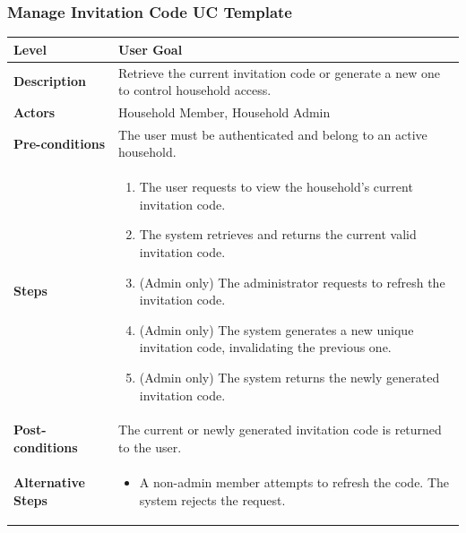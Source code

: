 \subsubsection{Manage Invitation Code UC Template}
\begin{longtable}{|p{3.5cm}|p{10.3cm}|}
\hline
\rowcolor{UCRow} \textbf{Level} & User Goal \\ \hline
\textbf{Description} & Retrieve the current invitation code or generate a new one to control household access. \\ \hline
\rowcolor{UCRow} \textbf{Actors} & Household Member, Household Admin \\ \hline
\textbf{Pre-conditions} & The user must be authenticated and belong to an active household. \\ \hline
\rowcolor{UCRow} \textbf{Steps} &
\begin{enumerate}[nosep, leftmargin=*]
    \item The user requests to view the household's current invitation code.
    \item The system retrieves and returns the current valid invitation code.
    \item (Admin only) The administrator requests to refresh the invitation code.
    \item (Admin only) The system generates a new unique invitation code, invalidating the previous one.
    \item (Admin only) The system returns the newly generated invitation code.
\end{enumerate} \\ \hline
\textbf{Post-conditions} & The current or newly generated invitation code is returned to the user. \\ \hline
\rowcolor{UCRow} \textbf{Alternative Steps} &
\begin{itemize}[nosep, leftmargin=2.5em]
    \item[\textbf{A1.}] A non-admin member attempts to refresh the code. The system rejects the request.
\end{itemize} \\ \hline
\end{longtable}

